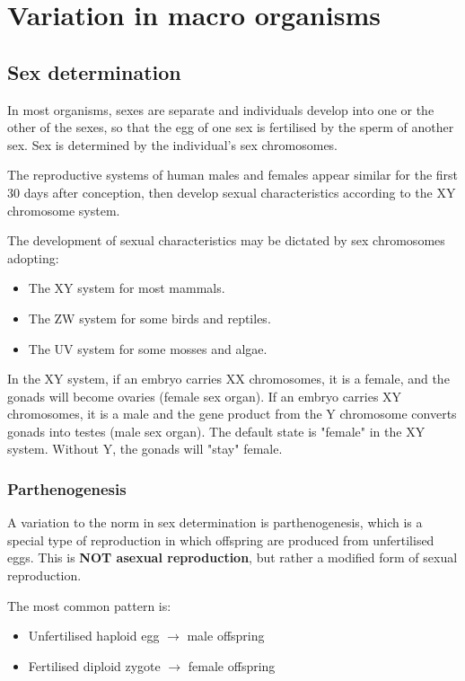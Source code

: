 \documentclass[11pt]{article}
\begin{document}
\section{Variation in macro organisms}
\label{sec:orgda87b8f}

\subsection{Sex determination}
\label{sec:org4bd55af}
In most organisms, sexes are separate and individuals develop into one or the other of the sexes, so that the egg of one sex is fertilised by the sperm of another sex. Sex is determined by the individual's sex chromosomes.


The reproductive systems of human males and females appear similar for the first 30 days after conception, then develop sexual characteristics according to the XY chromosome system.


The development of sexual characteristics may be dictated by sex chromosomes adopting:
\begin{itemize}
\item The XY system for most mammals.
\item The ZW system for some birds and reptiles.
\item The UV system for some mosses and algae.
\end{itemize}

In the XY system, if an embryo carries XX chromosomes, it is a female, and the gonads will become ovaries (female sex organ). If an embryo carries XY chromosomes, it is a male and the gene product from the Y chromosome converts gonads into testes (male sex organ). The default state is "female" in the XY system. Without Y, the gonads will "stay" female.

\newpage
\subsubsection{Parthenogenesis}
\label{sec:orgd00f3e3}
A variation to the norm in sex determination is parthenogenesis, which is a special type of reproduction in which offspring are produced from unfertilised eggs. This is \textbf{NOT asexual reproduction}, but rather a modified form of sexual reproduction.


The most common pattern is:
\begin{itemize}
\item Unfertilised haploid egg \(\rightarrow\) male offspring
\item Fertilised diploid zygote \(\rightarrow\) female offspring
\end{itemize}
\end{document}

